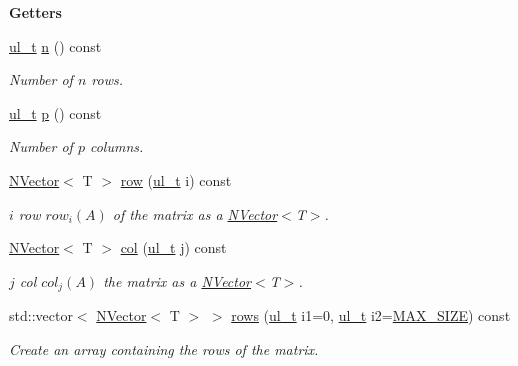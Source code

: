 \begin{Indent}\textbf{ Getters}\par
\begin{DoxyCompactItemize}
\item 
\mbox{\hyperlink{typedef_8h_a1b140a2034db3f5dfe18a987745df43a}{ul\+\_\+t}} \mbox{\hyperlink{class_n_p_matrix_afc181b7652d9427125c72c38d7c1498d}{n}} () const
\begin{DoxyCompactList}\small\item\em Number of $ n $ rows. \end{DoxyCompactList}\item 
\mbox{\hyperlink{typedef_8h_a1b140a2034db3f5dfe18a987745df43a}{ul\+\_\+t}} \mbox{\hyperlink{class_n_p_matrix_a3beee8acb5babf62d2b4f212ac5d18e8}{p}} () const
\begin{DoxyCompactList}\small\item\em Number of $ p $ columns. \end{DoxyCompactList}\item 
\mbox{\hyperlink{class_n_vector}{N\+Vector}}$<$ T $>$ \mbox{\hyperlink{class_n_p_matrix_a99ae2d8850ecdb33fbd9a71804ab4ea7}{row}} (\mbox{\hyperlink{typedef_8h_a1b140a2034db3f5dfe18a987745df43a}{ul\+\_\+t}} i) const
\begin{DoxyCompactList}\small\item\em $ i $ row $row_i(A) $ of the matrix as a {\ttfamily \mbox{\hyperlink{class_n_vector}{N\+Vector}}$<$T$>$}. \end{DoxyCompactList}\item 
\mbox{\hyperlink{class_n_vector}{N\+Vector}}$<$ T $>$ \mbox{\hyperlink{class_n_p_matrix_aa137db97da518f1dfb69e7eb8fa1b94d}{col}} (\mbox{\hyperlink{typedef_8h_a1b140a2034db3f5dfe18a987745df43a}{ul\+\_\+t}} j) const
\begin{DoxyCompactList}\small\item\em $ j $ col $col_j(A) $ the matrix as a {\ttfamily \mbox{\hyperlink{class_n_vector}{N\+Vector}}$<$T$>$}. \end{DoxyCompactList}\item 
std\+::vector$<$ \mbox{\hyperlink{class_n_vector}{N\+Vector}}$<$ T $>$ $>$ \mbox{\hyperlink{class_n_p_matrix_add861e9e1df81af2546c3eab1fd40d51}{rows}} (\mbox{\hyperlink{typedef_8h_a1b140a2034db3f5dfe18a987745df43a}{ul\+\_\+t}} i1=0, \mbox{\hyperlink{typedef_8h_a1b140a2034db3f5dfe18a987745df43a}{ul\+\_\+t}} i2=\mbox{\hyperlink{_n_vector_8h_a0592dba56693fad79136250c11e5a7fe}{M\+A\+X\+\_\+\+S\+I\+ZE}}) const
\begin{DoxyCompactList}\small\item\em Create an array containing the rows of the matrix. \end{DoxyCompactList}\item 

\end{DoxyCompactItemize}
\end{Indent}
